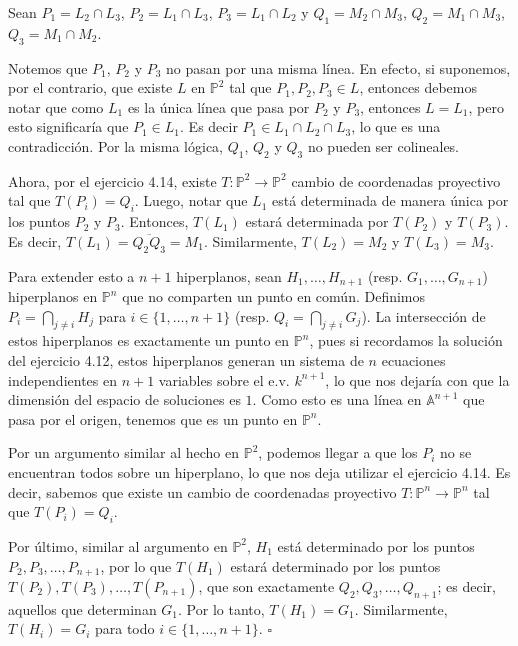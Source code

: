 \documentclass[12pt]{amsart}
\newenvironment{dem}{%
  \begin{trivlist}\item[\hskip\labelsep\textit{Demostración:}]%
}{\hfill$\square$\end{trivlist}}
\begin{document}
\begin{dem}
Sean $P_1 = L_2 \cap L_3$, $P_2 = L_1 \cap L_3$, $P_3 = L_1 \cap L_2$ y $Q_1 = M_2 \cap M_3$, $Q_2 = M_1 \cap M_3$, $Q_3 = M_1 \cap M_2$. \par
Notemos que $P_1$, $P_2$ y $P_3$ no pasan por una misma línea. En efecto, si suponemos, por el contrario, que existe $L$ en $\mathbb{P}^2$ tal que $P_1, P_2, P_3 \in L$, entonces debemos notar que como $L_1$ es la única línea que pasa por $P_2$ y $P_3$, entonces $L = L_1$, pero esto significaría que $P_1 \in L_1$. Es decir $P_1 \in L_1 \cap L_2 \cap L_3$, lo que es una contradicción. Por la misma lógica, $Q_1$, $Q_2$ y $Q_3$ no pueden ser colineales. \par
Ahora, por el ejercicio 4.14, existe $T: \mathbb{P}^2 \to \mathbb{P}^2$ cambio de coordenadas proyectivo tal que $T(P_i) = Q_i$. Luego, notar que $L_1$ está determinada de manera única por los puntos $P_2$ y $P_3$. Entonces, $T(L_1)$ estará determinada por $T(P_2)$ y $T(P_3)$. Es decir, $T(L_1) = \overline{Q_2 Q_3} = M_1$. Similarmente, $T(L_2) = M_2$ y $T(L_3) = M_3$.

Para extender esto a $n+1$ hiperplanos, sean $H_1, \ldots, H_{n+1}$ (resp. $G_1, \ldots, G_{n+1}$) hiperplanos en $\mathbb{P}^n$ que no comparten un punto en común. Definimos $P_i = \bigcap_{j \neq i} H_j$ para $i \in \{1, \ldots, n+1\}$ (resp. $Q_i = \bigcap_{j \neq i} G_j$). La intersección de estos hiperplanos es exactamente un punto en $\mathbb{P}^n$, pues si recordamos la solución del ejercicio 4.12, estos hiperplanos generan un sistema de $n$ ecuaciones independientes en $n+1$ variables sobre el e.v. $k^{n+1}$, lo que nos dejaría con que la dimensión del espacio de soluciones es $1$. Como esto es una línea en $\mathbb{A}^{n+1}$ que pasa por el origen, tenemos que es un punto en $\mathbb{P}^n$.

Por un argumento similar al hecho en $\mathbb{P}^2$, podemos llegar a que los $P_i$ no se encuentran todos sobre un hiperplano, lo que nos deja utilizar el ejercicio 4.14. Es decir, sabemos que existe un cambio de coordenadas proyectivo $T: \mathbb{P}^n \to \mathbb{P}^n$ tal que $T(P_i) = Q_i$.

	Por último, similar al argumento en $\mathbb{P}^2$, $H_1$ está determinado por los puntos $P_2, P_3, \ldots, P_{n+1}$, por lo que $T(H_1)$ estará determinado por los puntos $T(P_2), T(P_3), \ldots, T(P_{n+1})$, que son exactamente $Q_{2}, Q_{3}, \ldots, Q_{n+1}$; es decir, aquellos que determinan $G_1$. Por lo tanto, $T(H_1) = G_1$. Similarmente, $T(H_i) = G_i$ para todo $i \in \{1, \ldots, n+1\}$.
\end{dem}
\end{document}
